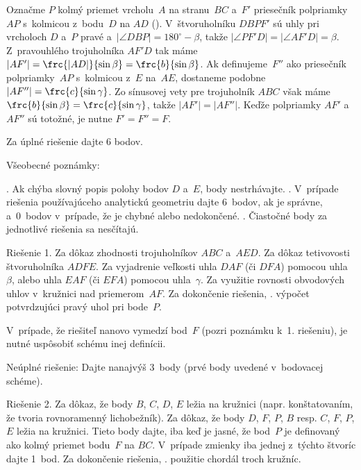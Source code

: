 {
Označme $P$ kolmý priemet vrcholu~$A$ na stranu~$BC$
a~$F'$ priesečník polpriamky~$AP$ s~kolmicou z~bodu~$D$ na $AD$ (\obr).
V~štvoruholníku $DBPF'$ sú uhly pri vrcholoch $D$ a~$P$
pravé a~$|\angle DBP| = 180^\circ- \beta$, takže $|\angle PF'D| = {|\angle
AF'D| = \beta}$. Z~pravouhlého trojuholníka $AF'D$ tak máme
$|AF'| = \frc {|AD|} {\sin \beta} = \frc {b} {\sin \beta}$. Ak
definujeme~$F''$ ako priesečník polpriamky~$AP$
s~kolmicou z~$E$ na~$AE$, dostaneme podobne $|AF''| = \frc {c} {\sin \gamma}$.
Zo sínusovej vety pre trojuholník $ABC$ však máme $\frc {b} {\sin \beta} =
\frc {c} {\sin \gamma}$, takže $|AF'| = |AF''|$. Keďže polpriamky
$AF'$ a~$AF''$ sú totožné, je nutne ${F' = F'' = F}$.
%


\schemaABC
Za úplné riešenie dajte 6 bodov.

{Všeobecné poznámky}: \par\nobreak
{}. Ak chýba slovný popis polohy bodov $D$ a~$E$, body nestrhávajte.
. V~prípade riešenia používajúceho analytickú geometriu
dajte 6~bodov, ak je správne, a~0~bodov v~prípade, že je chybné alebo nedokončené.
. Čiastočné body za jednotlivé riešenia sa nesčítajú.

\smallskip
{Riešenie 1.}
\* [1 bod] Za dôkaz zhodnosti trojuholníkov $ABC$ a~$AED$.
\* [1 bod] Za dôkaz tetivovosti štvoruholníka $ADFE$.
\* [1 bod] Za vyjadrenie veľkosti uhla $DAF$ (či $DFA$) pomocou uhla $\beta$,
alebo uhla $EAF$ (či $EFA$) pomocou uhla~$\gamma$.
\* [2 body] Za využitie rovnosti obvodových uhlov v~kružnici nad
priemerom~$AF$.
\* [1 bod] Za dokončenie riešenia, \tj. výpočet potvrdzujúci pravý uhol pri bode~$P$.

\item{}V~prípade, že riešiteľ nanovo vymedzí bod~$F$ (pozri poznámku k~1.
riešeniu), je nutné uspôsobiť schému inej definícii.

\item{}Neúplné riešenie:
Dajte nanajvýš 3~body (prvé body uvedené v~bodovacej schéme).

\smallskip
{Riešenie 2.}
\* [1 bod] Za dôkaz, že body $B$, $C$, $D$, $E$ ležia na kružnici
(napr. konštatovaním, že tvoria rovnoramenný lichobežník).
\* [2 body] Za dôkaz, že body $D$, $F$, $P$, $B$ resp. $C$, $F$, $P$, $E$
ležia na kružnici. Tieto body dajte, iba keď je jasné, že bod~$P$
je definovaný ako kolmý priemet bodu~$F$ na $BC$. V~prípade
zmienky iba jednej z~týchto štvoríc dajte 1~bod.
\* [3 body] Za dokončenie riešenia, \tj. použitie chordál troch kružníc.

}

